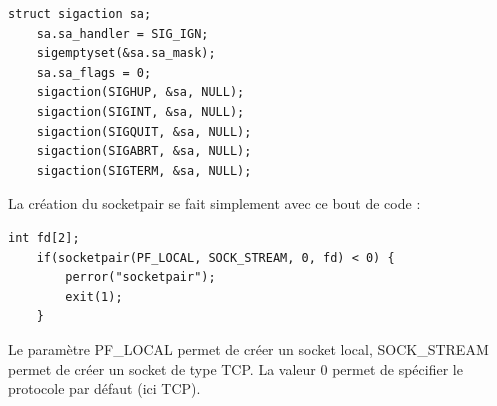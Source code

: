\documentclass[
	a4paper, %
	10pt, %
]{CSUniSchoolLabReport}
\begin{document}
\begin{lstlisting}[style=CStyle, firstnumber=1]
	struct sigaction sa;
	sa.sa_handler = SIG_IGN;
	sigemptyset(&sa.sa_mask);
	sa.sa_flags = 0;
	sigaction(SIGHUP, &sa, NULL);
	sigaction(SIGINT, &sa, NULL);
	sigaction(SIGQUIT, &sa, NULL);
	sigaction(SIGABRT, &sa, NULL);
	sigaction(SIGTERM, &sa, NULL);
\end{lstlisting}
La création du socketpair se fait simplement avec ce bout de code :
\begin{lstlisting}[style=CStyle, firstnumber=1]
	int fd[2];
    if(socketpair(PF_LOCAL, SOCK_STREAM, 0, fd) < 0) {
        perror("socketpair");
        exit(1);
    }
\end{lstlisting}
Le param\`etre PF\_LOCAL permet de créer un socket local, SOCK\_STREAM permet de créer un socket de type TCP. La valeur 0 permet de spécifier le protocole par défaut (ici TCP).
\end{document}
